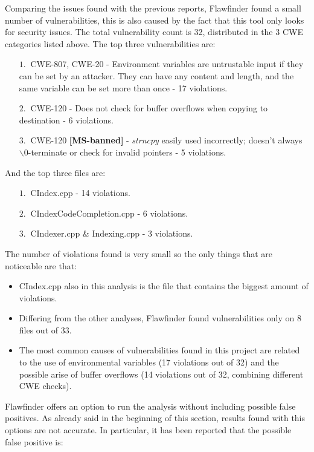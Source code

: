 Comparing the issues found with the previous reports, Flawfinder found a small number of vulnerabilities, this is also caused by the fact that this tool only looks for security issues.\newline
The total vulnerability count is 32, distributed in the 3 CWE categories listed above.\newline
The top three vulnerabilities are:
	\begin{itemize}
		\item[$1.\:$] CWE-807, CWE-20 - Environment variables are untrustable input if they can be set by an attacker. They can have any content and length, and the same variable can be set more than once - 17 violations.
		\item[$2.\:$] CWE-120 - Does not check for buffer overflows when copying to destination - 6 violations.
		\item[$3.\:$] CWE-120 \textbf{[MS-banned]} - \textsl{strncpy} easily used incorrectly; doesn't always $\backslash0$-terminate or check for invalid pointers - 5 violations.
	\end{itemize}

And the top three files are:

\begin{itemize}
		\item[$1.\:$] CIndex.cpp - 14 violations.
		\item[$2.\:$] CIndexCodeCompletion.cpp - 6 violations.
		\item[$3.\:$] CIndexer.cpp \& Indexing.cpp - 3 violations. 
\end{itemize}

The number of violations found is very small so the only things that are noticeable are that:
\begin{itemize}
		\item CIndex.cpp also in this analysis is the file that contains the biggest amount of violations.
		\item Differing from the other analyses, Flawfinder found vulnerabilities only on 8 files out of 33.
		\item The most common causes of vulnerabilities found in this project are related to the use of environmental variables (17 violations out of 32) and the possible arise of buffer overflows (14 violations out of 32, combining different CWE checks).
\end{itemize}

Flawfinder offers an option to run the analysis without including possible false positives.\newline
As already said in the beginning of this section, results found with this options are not accurate. In particular, it has been reported that the possible false positive is:

